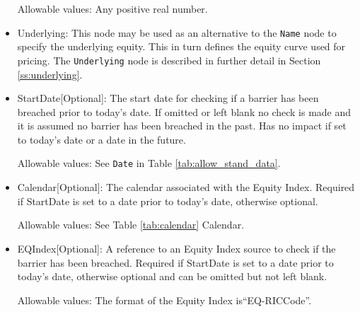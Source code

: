 \begin{itemize}
Allowable values:  Any positive real number.

\item Underlying:  This node may be used as an alternative to the \lstinline!Name! node to specify the underlying equity. This in turn defines the equity curve used for pricing. The \lstinline!Underlying! node is described in further detail in Section \ref{ss:underlying}.

\item StartDate[Optional]: The start date for checking if a barrier has been breached prior to today's date.  If omitted or left blank no check is made and it is assumed no barrier has been breached in the past. Has no impact if set to today's date or a date in the future.

Allowable values:  See \lstinline!Date! in Table \ref{tab:allow_stand_data}.

\item Calendar[Optional]: The calendar associated with the Equity Index. Required if StartDate is set to a date prior to today's date, otherwise optional.

Allowable values: See Table \ref{tab:calendar} Calendar.

\item EQIndex[Optional]: A reference to an Equity Index source to check if the barrier has been breached. Required if StartDate is set to a date prior to today's date, otherwise optional and can be omitted but not left blank.

Allowable values:  The format of the Equity Index is``EQ-RICCode''.
\end{itemize}


